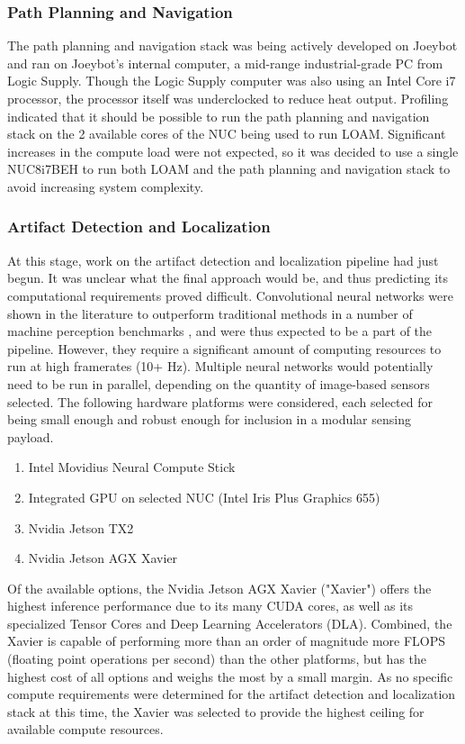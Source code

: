 \subsubsection{Path Planning and Navigation}

The path planning and navigation stack was being actively developed on Joeybot and ran on Joeybot's internal computer, a mid-range industrial-grade PC from Logic Supply. Though the Logic Supply computer was also using an Intel Core i7 processor, the processor itself was underclocked to reduce heat output. Profiling indicated that it should be possible to run the path planning and navigation stack on the 2 available cores of the NUC being used to run LOAM. Significant increases in the compute load were not expected, so it was decided to use a single NUC8i7BEH to run both LOAM and the path planning and navigation stack to avoid increasing system complexity.

\subsubsection{Artifact Detection and Localization}

At this stage, work on the artifact detection and localization pipeline had just begun. It was unclear what the final approach would be, and thus predicting its computational requirements proved difficult. Convolutional neural networks were shown in the literature to outperform traditional methods in a number of machine perception benchmarks \cite{deng2009imagenet,Geiger2013IJRR,lin2014microsoft}, and were thus expected to be a part of the pipeline. However, they require a significant amount of computing resources to run at high framerates (10+ Hz). Multiple neural networks would potentially need to be run in parallel, depending on the quantity of image-based sensors selected. The following hardware platforms were considered, each selected for being small enough and robust enough for inclusion in a modular sensing payload. 

\begin{enumerate}
	\item Intel Movidius Neural Compute Stick
	\item Integrated GPU on selected NUC (Intel Iris Plus Graphics 655)
	\item Nvidia Jetson TX2
	\item Nvidia Jetson AGX Xavier
\end{enumerate}

Of the available options, the Nvidia Jetson AGX Xavier ("Xavier") offers the highest inference performance due to its many CUDA cores, as well as its specialized Tensor Cores and Deep Learning Accelerators (DLA). Combined, the Xavier is capable of performing more than an order of magnitude more FLOPS (floating point operations per second) than the other platforms, but has the highest cost of all options and weighs the most by a small margin. As no specific compute requirements were determined for the artifact detection and localization stack at this time, the Xavier was selected to provide the highest ceiling for available compute resources.

